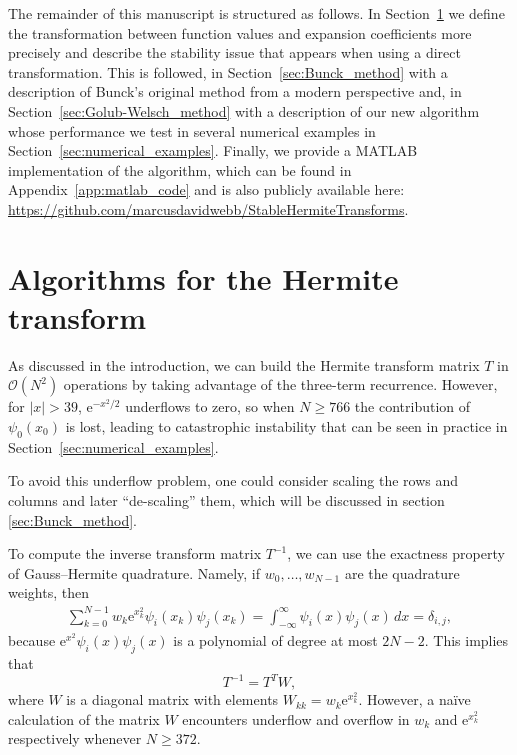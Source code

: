 \documentclass[10pt]{article}
\numberwithin{theorem}{section}
\newcommand{\georg}[1]{\textcolor{red}{#1}}
\begin{document}
The remainder of this manuscript is structured as follows. In Section~\ref{sec:hermite_transform} we define the transformation between function values and expansion coefficients more precisely and describe the stability issue that appears when using a direct transformation. This is followed, in Section~\ref{sec:Bunck_method} with a description of Bunck's original method from a modern perspective and, in Section~\ref{sec:Golub-Welsch_method} with a description of our new algorithm whose performance we test in several numerical examples in Section~\ref{sec:numerical_examples}. Finally, we provide a MATLAB implementation of the algorithm, which can be found in Appendix~\ref{app:matlab_code} and is also publicly available here: \url{https://github.com/marcusdavidwebb/StableHermiteTransforms}.


\section{Algorithms for the Hermite transform}\label{sec:hermite_transform}

As discussed in the introduction, we can build the Hermite transform matrix $T$ in $\mathcal{O}(N^2)$ operations by taking advantage of the three-term recurrence. However, for $|x| > 39$, $\mathrm{e}^{-x^2 / 2}$ underflows to zero, so when $N \geq 766$ the contribution of $\psi_0(x_0)$ is lost, leading to catastrophic instability that can be seen in practice in Section~\ref{sec:numerical_examples}. %

To avoid this underflow problem, one could consider scaling the rows and columns and later ``de-scaling'' them, which will be discussed in section \ref{sec:Bunck_method}.

To compute the inverse transform matrix $T^{-1}$, we can use the exactness property of Gauss--Hermite quadrature. Namely, if $w_0,\ldots,w_{N{-}1}$ are the quadrature weights, then
\begin{align}\label{eqn:GHexact}
    \sum_{k=0}^{N-1} w_k \mathrm{e}^{x_k^2} \psi_i(x_k) \psi_j(x_k) = \int_{-\infty}^\infty \psi_i(x) \psi_j(x) \,d x = \delta_{i,j},
\end{align}
because $\mathrm{e}^{x^2} \psi_i(x) \psi_j(x)$ is a polynomial of degree at most $2N-2$. This implies that
\begin{equation}\label{eqn:Tinv}
    T^{-1} = T^T W,
\end{equation}
where $W$ is a diagonal matrix with elements $W_{kk} = w_k \mathrm{e}^{x_k^2}$. However, a na\"ive calculation of the matrix $W$ encounters underflow and overflow in $w_k$ and $\mathrm{e}^{x_k^2}$ respectively whenever $N \geq 372$. 
\end{document}
